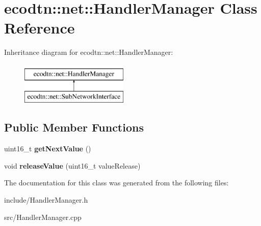 \hypertarget{classecodtn_1_1net_1_1HandlerManager}{}\section{ecodtn\+:\+:net\+:\+:Handler\+Manager Class Reference}
\label{classecodtn_1_1net_1_1HandlerManager}
Inheritance diagram for ecodtn\+:\+:net\+:\+:Handler\+Manager\+:\begin{figure}[H]
\begin{center}
\leavevmode
\includegraphics[height=2.000000cm]{classecodtn_1_1net_1_1HandlerManager}
\end{center}
\end{figure}
\subsection*{Public Member Functions}
\begin{DoxyCompactItemize}
\item 
\mbox{\label{classecodtn_1_1net_1_1HandlerManager_ace2e6cde9a316d5bbf1512bf33b4ad40}} 
uint16\+\_\+t {\bfseries get\+Next\+Value} ()
\item 
\mbox{\label{classecodtn_1_1net_1_1HandlerManager_a381465f79593ae978908eb5d22629e46}} 
void {\bfseries release\+Value} (uint16\+\_\+t value\+Release)
\end{DoxyCompactItemize}


The documentation for this class was generated from the following files\+:\begin{DoxyCompactItemize}
\item 
include/Handler\+Manager.\+h\item 
src/Handler\+Manager.\+cpp\end{DoxyCompactItemize}
